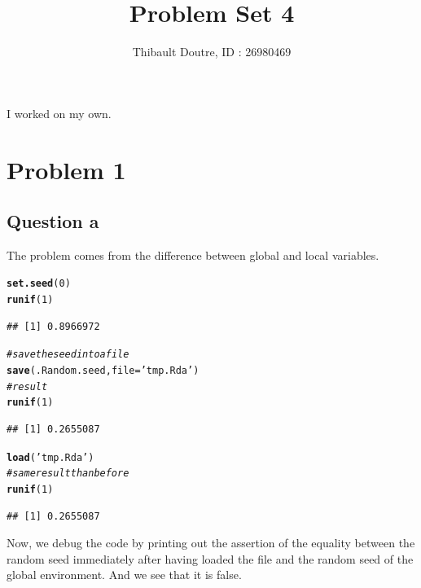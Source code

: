 \documentclass{llncs}\usepackage[]{graphicx}\usepackage[]{color}
\makeatletter
\newcommand{\hlnum}[1]{\textcolor[rgb]{0.686,0.059,0.569}{#1}}%
\newcommand{\hlstr}[1]{\textcolor[rgb]{0.192,0.494,0.8}{#1}}%
\newcommand{\hlcom}[1]{\textcolor[rgb]{0.678,0.584,0.686}{\textit{#1}}}%
\newcommand{\hlstd}[1]{\textcolor[rgb]{0.345,0.345,0.345}{#1}}%
\newcommand{\hlkwc}[1]{\textcolor[rgb]{0.333,0.667,0.333}{#1}}%
\newcommand{\hlkwd}[1]{\textcolor[rgb]{0.737,0.353,0.396}{\textbf{#1}}}%
\newenvironment{kframe}{%
 \def\at@end@of@kframe{}%
 \ifinner\ifhmode%
  \def\at@end@of@kframe{\end{minipage}}%
  \begin{minipage}{\columnwidth}%
 \fi\fi%
 \def\FrameCommand##1{\hskip\@totalleftmargin \hskip-\fboxsep
 \colorbox{shadecolor}{##1}\hskip-\fboxsep
     \hskip-\linewidth \hskip-\@totalleftmargin \hskip\columnwidth}%
 \MakeFramed {\advance\hsize-\width
   \@totalleftmargin\z@ \linewidth\hsize
   \@setminipage}}%
 {\par\unskip\endMakeFramed%
 \at@end@of@kframe}
\newenvironment{knitrout}{}{} %
\makeatother
\begin{document}
\title{Problem Set 4}
\author{Thibault Doutre, ID : 26980469}
\date{}
\maketitle
\bigbreak
\noindent
I worked on my own.
\section{Problem 1}
\subsection{Question a}
The problem comes from the difference between global and local variables. 
\begin{knitrout}
\color{fgcolor}\begin{kframe}
\begin{alltt}
\hlkwd{set.seed}\hlstd{(}\hlnum{0}\hlstd{)}
\hlkwd{runif}\hlstd{(}\hlnum{1}\hlstd{)}
\end{alltt}
\begin{lstlisting}[basicstyle=\ttfamily,breaklines=true]
## [1] 0.8966972
\end{lstlisting}
\begin{alltt}
\hlcom{# save the seed into a file}
\hlkwd{save}\hlstd{(.Random.seed,} \hlkwc{file} \hlstd{=} \hlstr{'tmp.Rda'}\hlstd{)}
\hlcom{# result}
\hlkwd{runif}\hlstd{(}\hlnum{1}\hlstd{)}
\end{alltt}
\begin{lstlisting}[basicstyle=\ttfamily,breaklines=true]
## [1] 0.2655087
\end{lstlisting}
\begin{alltt}
\hlkwd{load}\hlstd{(}\hlstr{'tmp.Rda'}\hlstd{)}
\hlcom{#same result than before}
\hlkwd{runif}\hlstd{(}\hlnum{1}\hlstd{)}
\end{alltt}
\begin{lstlisting}[basicstyle=\ttfamily,breaklines=true]
## [1] 0.2655087
\end{lstlisting}
\end{kframe}
\end{knitrout}
\noindent
Now, we debug the code by printing out the assertion of the equality between the random seed immediately after having loaded the file and the random seed of the global environment. And we see that it is false.
\end{document}

